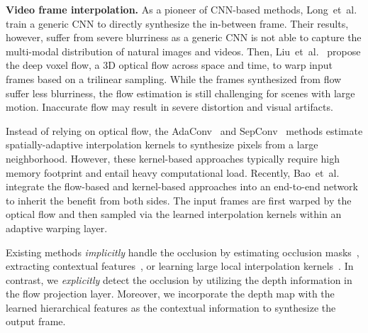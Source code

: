 \documentclass[10pt,twocolumn,letterpaper]{article}
\newcommand{\Paragraph}[1]{{\vspace{-2mm}\flushleft\textbf{#1}}} \newcommand{\ul}[1]{\underline{\smash{#1}}}
\def\etal{et~al.\xspace}
\begin{document}
	
	\Paragraph{Video frame interpolation.}
As a pioneer of CNN-based methods, Long~\etal~\cite{long2016learning} train a generic CNN to directly synthesize the in-between frame.
Their results, however, suffer from severe blurriness as a generic CNN is not able to capture the multi-modal distribution of natural images and videos.
Then, Liu~\etal~\cite{liu2017video} propose the deep voxel flow, a 3D optical flow across space and time, to warp input frames based on a trilinear sampling.
While the frames synthesized from flow suffer less blurriness, the flow estimation is still challenging for scenes with large motion.
Inaccurate flow may result in severe distortion and visual artifacts.
	
	
	
	
	Instead of relying on optical flow, the AdaConv~\cite{niklaus2017videoAdaConv} and SepConv~\cite{niklaus2017videoSepConv} methods estimate spatially-adaptive interpolation kernels to synthesize pixels from a large neighborhood.
However, these kernel-based approaches typically require high memory footprint and entail heavy computational load.
Recently, Bao~\etal~\cite{bao2018MEMC-Net} integrate the flow-based and kernel-based approaches into an end-to-end network to inherit the benefit from both sides.
The input frames are first warped by the optical flow and then sampled via the learned interpolation kernels within an adaptive warping layer.


	
	Existing methods \emph{implicitly} handle the occlusion by estimating occlusion masks~\cite{bao2018MEMC-Net, jiang2017super, xue2017video}, extracting contextual features~\cite{bao2018MEMC-Net, niklaus2018context}, or learning large local interpolation kernels~\cite{niklaus2017videoAdaConv, niklaus2017videoSepConv}.
In contrast, we \emph{explicitly} detect the occlusion by utilizing the depth information in the flow projection layer.
Moreover, we incorporate the depth map with the learned hierarchical features as the contextual information to synthesize the output frame.
	
	
	
	
	
\end{document}
